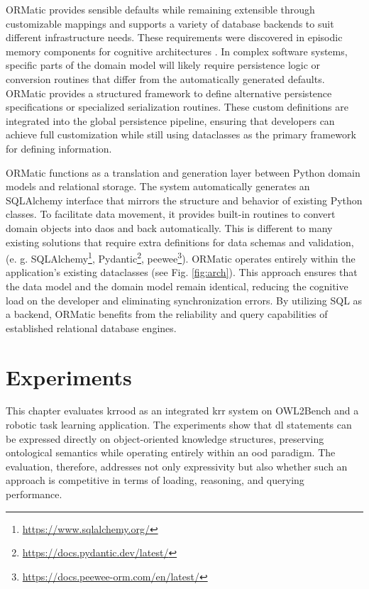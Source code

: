 \documentclass[a4paper,fleqn]{cas-sc}
\begin{document}
ORMatic provides sensible defaults while remaining extensible through customizable mappings and supports a variety of database backends to suit different infrastructure needs. These requirements were discovered in episodic memory components for cognitive architectures \citep{beetz2025robot}.
In complex software systems, specific parts of the domain model will likely require persistence logic or conversion routines that differ from the automatically generated defaults.
ORMatic provides a structured framework to define alternative persistence specifications or specialized serialization routines. These custom definitions are integrated into the global persistence pipeline, ensuring that developers can achieve full customization while still using dataclasses as the primary framework for defining information.

ORMatic functions as a translation and generation layer between Python domain models and relational storage. The system automatically generates an SQLAlchemy interface that mirrors the structure and behavior of existing Python classes. To facilitate data movement, it provides built-in routines to convert domain objects into \acp{dao} and back automatically.
This is different to many existing solutions that require extra definitions for data schemas and validation, (e. g. SQLAlchemy\footnote{\url{https://www.sqlalchemy.org/}}, Pydantic\footnote{\url{https://docs.pydantic.dev/latest/}}, peewee\footnote{\url{https://docs.peewee-orm.com/en/latest/}}). ORMatic operates entirely within the application's existing dataclasses (see Fig. \ref{fig:arch}).
This approach ensures that the data model and the domain model remain identical, reducing the cognitive load on the developer and eliminating synchronization errors. By utilizing SQL as a backend, ORMatic benefits from the reliability and query capabilities of established relational database engines.

\section{Experiments}
\label{sec:experiments}

This chapter evaluates \ac{krrood} as an integrated \ac{krr} system on OWL2Bench and a robotic task learning application. The experiments show that \ac{dl} statements can be expressed directly on object-oriented knowledge structures, preserving ontological semantics while operating entirely within an \ac{ood} paradigm. The evaluation, therefore, addresses not only expressivity but also whether such an approach is competitive in terms of loading, reasoning, and querying performance.
\end{document}
